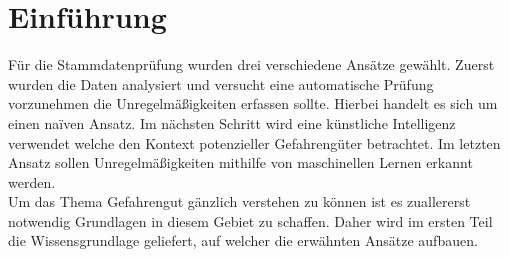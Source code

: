 \section{Einführung}

Für die Stammdatenprüfung wurden drei verschiedene Ansätze gewählt. Zuerst
wurden die Daten analysiert und versucht eine automatische Prüfung vorzunehmen
die Unregelmäßigkeiten erfassen sollte. Hierbei handelt es sich um einen
na\"iven Ansatz. Im nächsten Schritt wird eine künstliche Intelligenz verwendet
welche den Kontext potenzieller Gefahrengüter betrachtet. Im letzten Ansatz
sollen Unregelmäßigkeiten mithilfe von maschinellen Lernen erkannt werden.\\

Um das Thema Gefahrengut gänzlich verstehen zu können ist es zuallererst
notwendig Grundlagen in diesem Gebiet zu schaffen. Daher wird im ersten Teil
die Wissensgrundlage geliefert, auf welcher die erwähnten Ansätze aufbauen.
